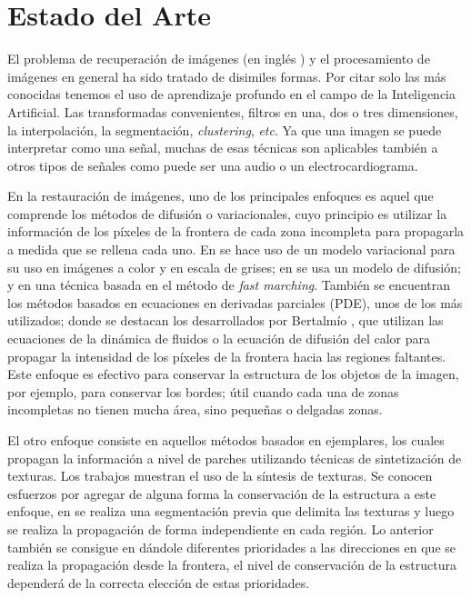 \section*{Estado del Arte}

El problema de recuperaci\'on de im\'agenes (en ingl\'es \II) y el procesamiento de imágenes en general ha sido tratado de disimiles formas. Por citar solo las m\'as conocidas tenemos el uso de aprendizaje profundo en el campo de la Inteligencia Artificial. Las transformadas convenientes, filtros en una, dos o tres dimensiones, la interpolaci\'on, la segmentaci\'on, \textit{clustering}, \textit{etc}. Ya que una imagen se puede interpretar como una señal, muchas de esas t\'ecnicas son aplicables tambi\'en a otros tipos de señales como puede ser una audio o un electrocardiograma.

En la restauraci\'on de im\'agenes, uno de los principales enfoques es aquel que comprende los m\'etodos de difusión o variacionales, cuyo principio es utilizar la informaci\'on de los p\'ixeles de la frontera de cada zona incompleta para propagarla a medida que se rellena cada uno. En \cite{ballester2001variational} se hace uso de un modelo variacional para su uso en im\'agenes a color y en escala de grises; en \cite{chan2001nontexture} se usa un modelo de difusión; y en \cite{telea2004image} una t\'ecnica basada en el m\'etodo de \textit{fast marching}. También se encuentran los métodos basados en ecuaciones en derivadas parciales (PDE), unos de los m\'as utilizados; donde se destacan los desarrollados por Bertalmío \cite{bertalmio2001navier,bertalmio2000image}, que utilizan las ecuaciones de la dinámica de fluidos o la ecuación de difusión del calor para propagar la intensidad de los píxeles de la frontera hacia las regiones faltantes. Este enfoque es efectivo para conservar la estructura de los objetos de la imagen, por ejemplo, para conservar los bordes; \'util cuando cada una de zonas incompletas no tienen mucha área, sino pequeñas o delgadas zonas.

El otro enfoque consiste en aquellos m\'etodos basados en ejemplares, los cuales propagan la informaci\'on a nivel de parches utilizando t\'ecnicas de sintetizaci\'on de texturas. Los trabajos \cite{ashikhmin2001synthesizing,garber1981computational,liang2001real} muestran el uso de la s\'intesis de texturas. Se conocen esfuerzos por agregar de alguna forma la conservaci\'on de la estructura a este enfoque, en \cite{li2014image} se realiza una segmentaci\'on previa que delimita las texturas y luego se realiza la propagaci\'on de forma independiente en cada regi\'on. Lo anterior tambi\'en se consigue en \cite{criminisi2003object, wang2011image} d\'andole diferentes prioridades a las direcciones en que se realiza la propagaci\'on desde la frontera, el nivel de conservaci\'on de la estructura depender\'a de la correcta elecci\'on de estas prioridades.

